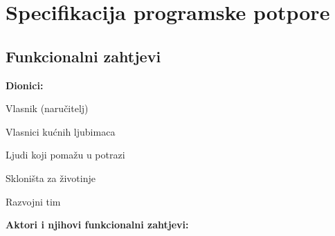 \chapter{Specifikacija programske potpore}

\section{Funkcionalni zahtjevi}





\noindent \textbf{Dionici:}

\begin{packed_enum}
	
	\item Vlasnik (naručitelj)
	\item Vlasnici kućnih ljubimaca				
	\item Ljudi koji pomažu u potrazi
	\item Skloništa za životinje
	\item Razvojni tim
	
\end{packed_enum}

\noindent \textbf{Aktori i njihovi funkcionalni zahtjevi:}


